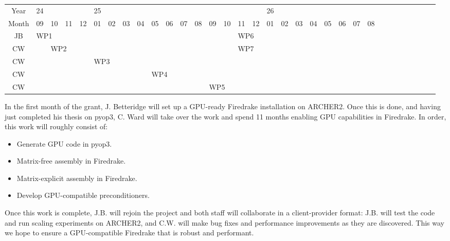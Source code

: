 \documentclass[a4paper,11pt]{article}
\begin{document}
\begin{landscape}
\noindent\begin{tabularx}{1.49\textwidth}{|c|c|c|c|c|c|c|c|c|c|c|c|c|c|c|c|c|c|c|c|c|c|c|c|c|c|c|c|c|c|c|c|c}
\hline
Year & 24 &&&& 25 &&&&&&&&&&&& 26 &&&&&&&\\
Month &
09 & 10 & 11 & 12 &
01 & 02 & 03 & 04 & 05 & 06 & 07 & 08 & 09 & 10 & 11 & 12 &
01 & 02 & 03 & 04 & 05 & 06 & 07 & 08 \\\hline
JB & \multicolumn{2}{l|}{\cellcolor{orange}WP1} & \multicolumn{12}{l|}{\cellcolor{gray}} & \multicolumn{10}{l|}{\cellcolor{orange}WP6} \\\hline 
CW & \cellcolor{gray} & \multicolumn{5}{l|}{\cellcolor{orange}WP2} & \multicolumn{8}{l|}{\cellcolor{gray}} & \multicolumn{10}{l|}{\cellcolor{orange}WP7} \\\hline
CW & \multicolumn{4}{l|}{\cellcolor{gray}} & \multicolumn{6}{l|}{\cellcolor{orange}WP3} & \multicolumn{14}{l|}{\cellcolor{gray}} \\\hline
CW & \multicolumn{8}{l|}{\cellcolor{gray}} & \multicolumn{6}{l|}{\cellcolor{orange}WP4} & \multicolumn{10}{l|}{\cellcolor{gray}} \\\hline
CW & \multicolumn{12}{l|}{\cellcolor{gray}} & \multicolumn{6}{l|}{\cellcolor{orange}WP5} & \multicolumn{6}{l|}{\cellcolor{gray}} \\\hline
\end{tabularx}

\begin{multicols}{2}
In the first month of the grant, J. Betteridge will set up a GPU-ready Firedrake installation on ARCHER2. Once this is done, and having just completed his thesis on pyop3, C. Ward will take over the work and spend 11 months enabling GPU capabilities in Firedrake. In order, this work will roughly consist of: 
\begin{itemize}[itemsep=-2pt,topsep=2pt]
	\item Generate GPU code in pyop3.
    \item Matrix-free assembly in Firedrake. 
    \item Matrix-explicit assembly in Firedrake. 
    \item Develop GPU-compatible preconditioners. 
\end{itemize}

Once this work is complete, J.B. will rejoin the project and both staff will collaborate in a client-provider format: J.B. will test the code and run scaling experiments on ARCHER2, and C.W. will make bug fixes and performance improvements as they are discovered. This way we hope to ensure a GPU-compatible Firedrake that is robust and performant. 


\end{multicols}
\end{landscape}
\end{document}
